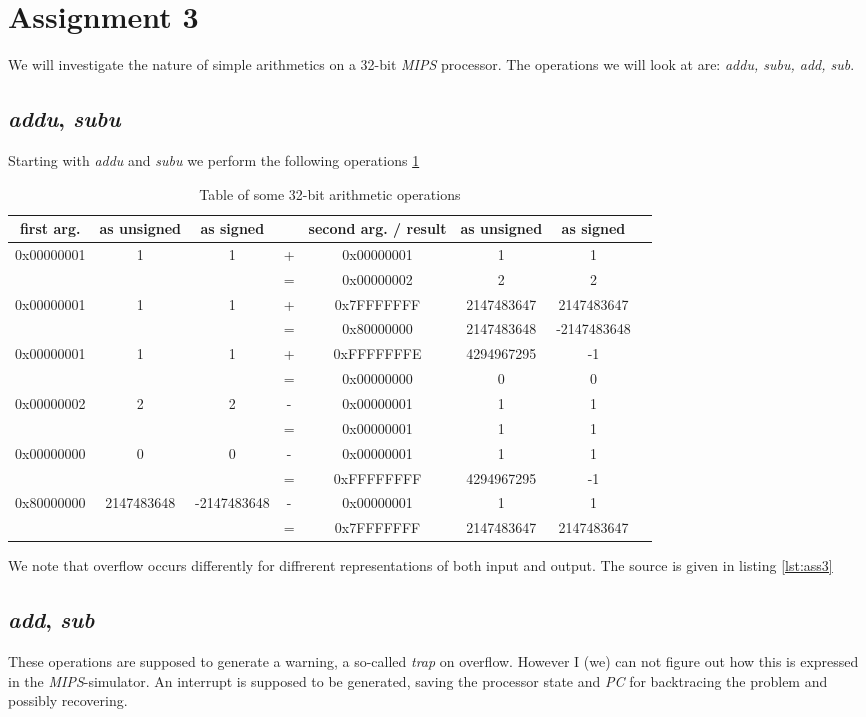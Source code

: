 \section{Assignment 3}
We will investigate the nature of simple arithmetics on a 32-bit \emph{MIPS}
processor. The operations we will look at are: \emph{addu, subu, add, sub}.

\subsection{\emph{addu}, \emph{subu}}
Starting with \emph{addu} and \emph{subu} we perform the following operations
\ref{optable}

 \begin{table}[ht]
\centering
\begin{tabular}{c c c c c c c c}
first arg. & as unsigned & as signed &  & second arg. / result & as unsigned &
as signed\\\hline
0x00000001 & 1 & 1 & + & 0x00000001 & 1 & 1\\
&  &  & = & 0x00000002 & 2 & 2\\ \hline
0x00000001 & 1 & 1 & + & 0x7FFFFFFF & 2147483647 & 2147483647\\
&  &  & = & 0x80000000 & 2147483648 & -2147483648\\\hline
0x00000001 & 1 & 1 & + & 0xFFFFFFFE & 4294967295 & -1\\
&  &  & = & 0x00000000 & 0 & 0\\\hline
0x00000002 & 2 & 2 & - & 0x00000001 & 1 & 1\\
&  &  & = & 0x00000001 & 1 & 1\\\hline
0x00000000 & 0 & 0 & - & 0x00000001 & 1 & 1\\
&  &  & = & 0xFFFFFFFF & 4294967295 & -1\\\hline
0x80000000 & 2147483648 & -2147483648 & - & 0x00000001 & 1 & 1\\
&  &  & = & 0x7FFFFFFF & 2147483647 & 2147483647\\\hline
\end{tabular}
\caption{Table of some 32-bit arithmetic operations}
\label{optable}
\end{table}
We note that overflow occurs differently for diffrerent representations of both
input and output. The source is given in listing \ref{lst:ass3}


\subsection{\emph{add}, \emph{sub}}
These operations are supposed to generate a warning, a so-called \emph{trap} on
overflow. However I (we) can not figure out how this is expressed in the
\emph{MIPS}-simulator. An interrupt is supposed to be generated, saving the
processor state and \emph{PC} for backtracing the problem and possibly
recovering.
